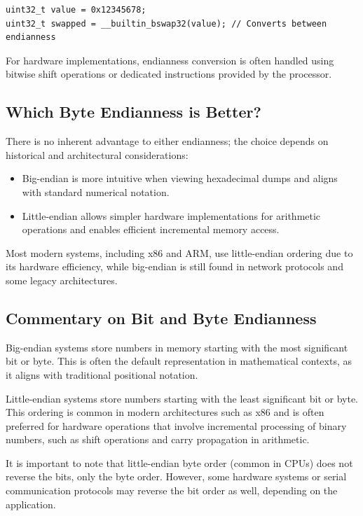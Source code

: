 \begin{verbatim}
uint32_t value = 0x12345678;
uint32_t swapped = __builtin_bswap32(value); // Converts between endianness
\end{verbatim}

For hardware implementations, endianness conversion is often handled using bitwise shift operations or dedicated instructions provided by the processor.

\subsection{Which Byte Endianness is Better?}
There is no inherent advantage to either endianness; the choice depends on historical and architectural considerations:
\begin{itemize}
    \item Big-endian is more intuitive when viewing hexadecimal dumps and aligns with standard numerical notation.
    \item Little-endian allows simpler hardware implementations for arithmetic operations and enables efficient incremental memory access.
\end{itemize}

Most modern systems, including x86 and ARM, use little-endian ordering due to its hardware efficiency, while big-endian is still found in network protocols and some legacy architectures.

\subsection{Commentary on Bit and Byte Endianness}
Big-endian systems store numbers in memory starting with the most significant bit or byte. This is often the default representation in mathematical contexts, as it aligns with traditional positional notation.

Little-endian systems store numbers starting with the least significant bit or byte. This ordering is common in modern architectures such as x86 and is often preferred for hardware operations that involve incremental processing of binary numbers, such as shift operations and carry propagation in arithmetic.

It is important to note that little-endian byte order (common in CPUs) does not reverse the bits, only the byte order. However, some hardware systems or serial communication protocols may reverse the bit order as well, depending on the application.


